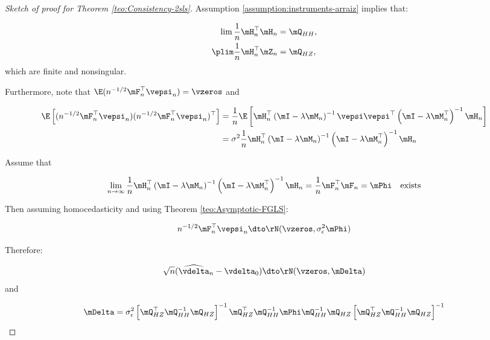 \documentclass[english,12pt]{book}\usepackage[]{graphicx}\usepackage[]{xcolor}
\begin{document}
\begin{proof}[Sketch of proof for Theorem \ref{teo:Consistency-2sls}]
Assumption \ref{assumption:instruments-arraiz} implies that:

\begin{equation*}
\begin{aligned}
  \lim \frac{1}{n}\mH_n^\top\mH_n &= \mQ_{HH}, \\
  \plim \frac{1}{n}\mH_n^\top\mZ_n & = \mQ_{HZ},
\end{aligned}
\end{equation*}
%
which are finite and nonsingular. 

Furthermore, note that $\E(n^{-1/2}\mF_n^\top\vepsi_n) = \vzeros$ and 

\begin{equation*}
\begin{aligned}
\E\left[(n^{-1/2}\mF_n^\top\vepsi_n)(n^{-1/2}\mF_n^\top\vepsi_n)^\top\right] & = \frac{1}{n}\E\left[\mH_n^\top\left(\mI -\lambda\mM_n\right)^{-1}\vepsi\vepsi^\top\left(\mI -\lambda\mM_n^\top\right)^{-1} \mH_n \right] \\
& = \sigma^2\frac{1}{n}\mH_n^\top\left(\mI -\lambda\mM_n\right)^{-1}\left(\mI -\lambda\mM_n^\top\right)^{-1} \mH_n 
\end{aligned}
\end{equation*}

Assume that 

\begin{equation*}
\lim_{n\to\infty}\frac{1}{n}\mH_n^\top\left(\mI -\lambda\mM_n\right)^{-1}\left(\mI -\lambda\mM_n^\top\right)^{-1} \mH_n = \frac{1}{n}\mF^\top_n\mF_n =\mPhi\quad \mbox{exists}
\end{equation*}

Then assuming homocedasticity and using Theorem \ref{teo:Asymptotic-FGLS}:

\begin{equation*}
n^{-1/2}\mF_n^\top\vepsi_n\dto \rN(\vzeros, \sigma^2_{\epsilon}\mPhi)
\end{equation*}

Therefore:

\begin{equation*}
\sqrt{n}(\widehat{\vdelta}_{n} - \vdelta_0) \dto \rN(\vzeros, \mDelta)
\end{equation*}
%
and

\begin{equation*}
  \mDelta = \sigma^2_{\epsilon}\left[\mQ_{HZ}^\top\mQ_{HH}^{-1}\mQ_{HZ}\right]^{-1}\mQ_{HZ}^\top\mQ_{HH}^{-1}\mPhi\mQ_{HH}^{-1}\mQ_{HZ}\left[\mQ_{HZ}^\top\mQ_{HH}^{-1}\mQ_{HZ}\right]^{-1}
\end{equation*}


\end{proof}
\end{document}
